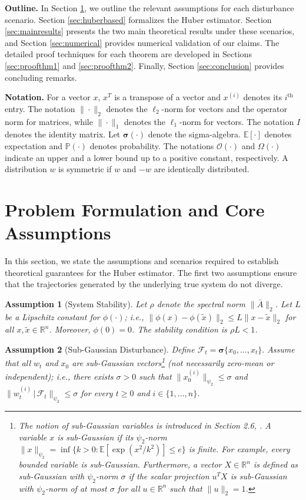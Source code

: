 \documentclass[letterpaper,10pt,conference]{ieeeconf}
\theoremstyle{plain} %
\theoremstyle{plain} %
\theoremstyle{plain} %
\newtheorem{assumption}{Assumption}
\theoremstyle{plain}
\begin{document}
\textbf{Outline. } In Section \ref{sec:probform}, we outline the relevant assumptions for each disturbance scenario. Section \ref{sec:huberbased} formalizes the Huber estimator. Section \ref{sec:mainresults} presents the two main theoretical results under these scenarios, and Section \ref{sec:numerical} provides numerical validation of our claims. The detailed proof techniques for each theorem are developed in Sections \ref{sec:proofthm1} and \ref{sec:proofthm2}. Finally, Section \ref{sec:conclusion} provides concluding remarks.

\textbf{Notation. } For a vector $x$, $x^T$  is a transpose of a vector and  $x^{(i)}$ denotes its $i^\text{th}$ entry. The notation $\|\cdot \|_2$ denotes the $\ell_2$-norm for vectors and the operator norm for matrices, while $\|\cdot \|_1$ denotes the $\ell_1$-norm for vectors. 
The notation $I$ denotes the identity matrix. Let $\bm{\sigma}(\cdot)$ denote the sigma-algebra. 
$\mathbb{E}[\cdot]$ denotes expectation and $\mathbb{P}(\cdot)$ denotes probability. The notations $\mathcal{O}(\cdot)$ and $\Omega(\cdot)$ indicate an upper and a lower bound up to a positive constant, respectively. A distribution $w$ is symmetric if $w$ and $-w$ are identically distributed.

\section{Problem Formulation and Core Assumptions}\label{sec:probform}

In this section, we state the assumptions and scenarios required to establish theoretical guarantees for the Huber estimator. The first two assumptions ensure that the trajectories generated by the underlying true system do not diverge.

\begin{assumption}[System Stability]\label{as:stability}
Let $\rho$ denote the spectral norm $\|\bar A\|_2$. Let $L$ be a Lipschitz constant for $\phi(\cdot)$; \textit{i.e.}, $\|\phi(x)-\phi(\tilde x )\|_2 \le L\|x-\tilde x\|_2$ for all $x,\tilde x \in\mathbb{R}^n$. Moreover, $\phi(0)= 0$.  The stability condition is $\rho L< 1$.
\end{assumption}


\begin{assumption}[Sub-Gaussian Disturbance]\label{as:subg}
Define $\mathcal{F}_t = \bm{\sigma}\{x_0, \dots, x_t\}.$
Assume that all $w_t$ and $x_0$ are sub-Gaussian vectors\footnote{The notion of sub-Gaussian variables is introduced in Section 2.6, \cite{vershynin2025high}. A variable $x$ is sub-Gaussian if its $\psi_2$-norm $\|x\|_{\psi_2}= \inf\{k>0: \mathbb{E}[\exp(x^2/k^2)] \le e\}$ is finite. For example, every bounded variable is sub-Gaussian.
Furthermore, a vector $X \in \mathbb{R}^n$ is defined as sub-Gaussian with $\psi_2$-norm $\sigma$ if the scalar projection $u^T X$ is sub-Gaussian with $\psi_2$-norm of at most $\sigma$ for all $u \in \mathbb{R}^n$ such that $\|u\|_2 = 1$. } (not necessarily zero-mean or independent); \textit{i.e.}, there exists $\sigma > 0$ such that $\|x_0^{(i)}\|_{\psi_2}\le \sigma$ and $\|w_t^{(i)}\,|\,\mathcal{F}_t\|_{\psi_2} \le \sigma$ for every $t \ge 0$ and $i\in\{1,\dots,n\}$. 
\end{assumption}
\end{document}
